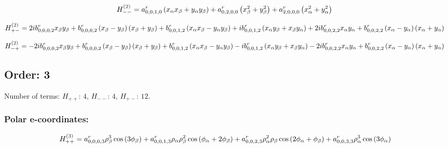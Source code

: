 \documentclass[fleqn]{article}
\begin{document}
\begin{dmath*}
H_{--}^{(2)}=a^{r}_{0,0,1,0} \left(x_{\alpha} x_{\beta} + y_{\alpha} y_{\beta}\right) + a^{r}_{0,2,0,0} \left(x_{\beta}^{2} + y_{\beta}^{2}\right) + a^{r}_{2,0,0,0} \left(x_{\alpha}^{2} + y_{\alpha}^{2}\right)\\
\end{dmath*}

\begin{dmath*}
H_{+-}^{(2)}=2 i b^{r}_{0,0,0,2} x_{\beta} y_{\beta} + b^{r}_{0,0,0,2} \left(x_{\beta} - y_{\beta}\right) \left(x_{\beta} + y_{\beta}\right) + b^{r}_{0,0,1,2} \left(x_{\alpha} x_{\beta} - y_{\alpha} y_{\beta}\right) +  i b^{r}_{0,0,1,2} \left(x_{\alpha} y_{\beta} + x_{\beta} y_{\alpha}\right) + 2 i b^{r}_{0,0,2,2} x_{\alpha} y_{\alpha} + b^{r}_{0,0,2,2} \left(x_{\alpha} - y_{\alpha}\right) \left(x_{\alpha} + y_{\alpha}\right)\\
\end{dmath*}

\begin{dmath*}
H_{-+}^{(2)}=- 2 i b^{r}_{0,0,0,2} x_{\beta} y_{\beta} + b^{r}_{0,0,0,2} \left(x_{\beta} - y_{\beta}\right) \left(x_{\beta} + y_{\beta}\right) + b^{r}_{0,0,1,2} \left(x_{\alpha} x_{\beta} - y_{\alpha} y_{\beta}\right) -  i b^{r}_{0,0,1,2} \left(x_{\alpha} y_{\beta} + x_{\beta} y_{\alpha}\right) - 2 i b^{r}_{0,0,2,2} x_{\alpha} y_{\alpha} + b^{r}_{0,0,2,2} \left(x_{\alpha} - y_{\alpha}\right) \left(x_{\alpha} + y_{\alpha}\right)\\
\end{dmath*}
\subsection{Order: 3}
Number of terms: $H_{++}$: $4$, $H_{--}$: $4$, $H_{+-}$: $12$.
\subsubsection*{Polar e-coordinates:}

\begin{dmath*}
H_{++}^{(3)}=a^{r}_{0,0,0,3} \rho_{\beta}^{3} \cos{\left (3 \phi_{\beta} \right )} + a^{r}_{0,0,1,3} \rho_{\alpha} \rho_{\beta}^{2} \cos{\left (\phi_{\alpha} + 2 \phi_{\beta} \right )} + a^{r}_{0,0,2,3} \rho_{\alpha}^{2} \rho_{\beta} \cos{\left (2 \phi_{\alpha} + \phi_{\beta} \right )} + a^{r}_{0,0,3,3} \rho_{\alpha}^{3} \cos{\left (3 \phi_{\alpha} \right )}\\
\end{dmath*}
\end{document}
